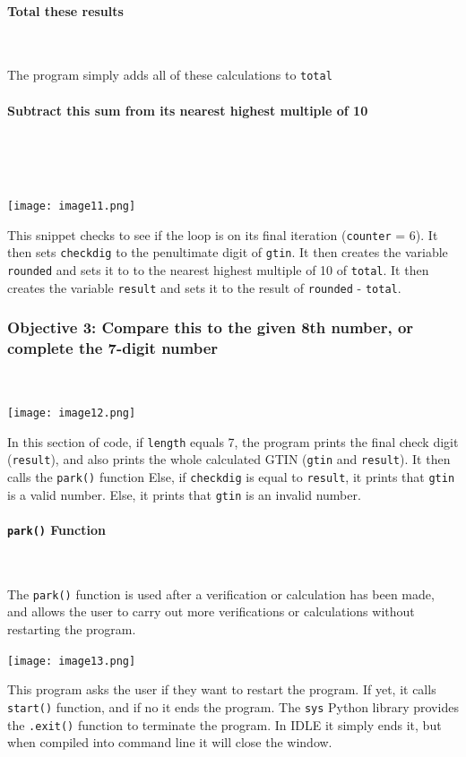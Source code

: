 \documentclass[a4paper]{article}
\begin{document}
\paragraph{Total these results} ~\par
\noindent The program simply adds all of these calculations to \verb|total|
\paragraph{Subtract this sum from its nearest highest multiple of 10} ~\par ~\par
\noindent\texttt{[image: image11.png]} ~\par
This snippet checks to see if the loop is on its final iteration (\verb|counter| = 6). It then sets \verb|checkdig| to the penultimate digit of \verb?gtin?. It then creates the variable \verb?rounded? and sets it to to the nearest highest multiple of 10 of \verb?total?. It then creates the variable \verb?result? and sets it to the result of \verb?rounded? - \verb?total?.
\subsubsection{Objective 3: Compare this to the given 8th number, or complete the 7-digit number} ~\par
\noindent\texttt{[image: image12.png]} ~\par
In this section of code, if \verb?length? equals 7, the program prints the final check digit (\verb?result?), and also prints the whole calculated GTIN (\verb?gtin? and \verb?result?). It then calls the \verb|park()| function
Else, if \verb?checkdig? is equal to \verb?result?, it prints that \verb?gtin? is a valid number. Else, it prints that \verb?gtin? is an invalid number.
\paragraph{\texttt{park()} Function} ~ \par
The \verb|park()| function is used after a verification or calculation has been made, and allows the user to carry out more verifications or calculations without restarting the program. \par
\noindent\texttt{[image: image13.png]} \par
This program asks the user if they want to restart the program. If yet, it calls \verb|start()| function, and if no it ends the program. The \verb|sys| Python library provides the \verb|.exit()| function to terminate the program. In IDLE it simply ends it, but when compiled into command line it will close the window.
\end{document}
